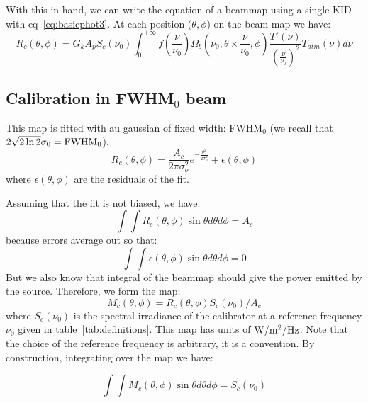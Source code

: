 With this in hand, we can write the equation of a beammap using a
single KID with eq~\ref{eq:basicphot3}. At each position ($\theta,
\phi$) on the beam map we have:
\begin{equation}
R_{c}(\theta, \phi) =  G_{k} A_{p} S_{c} (\nu_{0})  \int_{0}^{+\infty}
f(\frac{\nu}{\nu_{0}}) \Omega_{b}(\nu_{0}, \theta \times \frac{\nu}{\nu_{0}},
\phi) \frac{T'(\nu)}{\left(\frac{\nu}{\nu_{0}}\right)^{2}}
T_{atm}(\nu) d\nu
\label{eq:beammap}
\end{equation}

\subsection{Calibration in FWHM$_{0}$ beam}

This map is fitted with au gaussian of fixed width: FWHM$_{0}$ (we
recall that $2 \sqrt{2\ln{2}} \sigma_{0} =  {\rm FWHM}_{0}$).
\begin{equation} 
R_{c}(\theta, \phi) = \frac{A_{c}}{2 \pi \sigma_{o}^{2}}
e^{-\frac{\theta^{2}}{2\sigma_{0}^{2}}}  + \epsilon(\theta, \phi)
\end{equation}
where $\epsilon(\theta, \phi)$ are the residuals of the fit.

Assuming that the fit is not biased, we have:
\begin{equation} 
\int\int R_{c}(\theta, \phi) \sin \theta d\theta d\phi = A_{c}
\end{equation}
because errors average out so that:
\begin{equation} 
\int\int \epsilon (\theta, \phi) \sin \theta d\theta d\phi = 0
\end{equation}
But we also know that integral of the beammap should give the power
emitted by the source. Therefore, we form the map:
\begin{equation}
M_{c}(\theta, \phi) = R_{c}(\theta, \phi)   S_{c} (\nu_{0}) / A_{c}
\end{equation}
where  $S_{c} (\nu_{0})$ is the spectral irradiance of the calibrator
at a reference frequency $\nu_{0}$ given in
table~\ref{tab:definitions}. This map has units of $\rm W/m^{2}/Hz$. Note
that the choice of the reference frequency is arbitrary, it is a
convention. By construction, integrating over the map we have:

\begin{equation}
\int\int M_{c}(\theta, \phi) \sin \theta d\theta d\phi = S_{c}(\nu_{0})
\end{equation}



